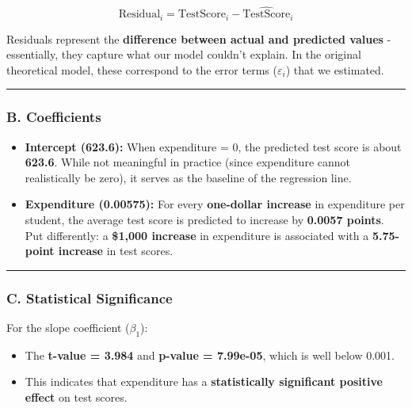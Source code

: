 \documentclass[
  12pt,
  letterpaper,
]{scrbook}
\providecommand{\tightlist}{%
  \setlength{\itemsep}{0pt}\setlength{\parskip}{0pt}}
\renewcommand{\tightlist}{\setlength{\itemsep}{0.5\baselineskip}\setlength{\parskip}{0.2\baselineskip}}
\theoremstyle{plain}
\theoremstyle{definition}
\theoremstyle{remark}
\begin{document}
\[
\text{Residual}_i = \text{TestScore}_i - \widehat{\text{TestScore}}_i
\]

Residuals represent the \textbf{difference between actual and predicted
values} - essentially, they capture what our model couldn't explain. In
the original theoretical model, these correspond to the error terms
(\(\varepsilon_i\)) that we estimated.

\begin{center}\rule{0.5\linewidth}{0.5pt}\end{center}

\subsubsection{\texorpdfstring{B.
\textbf{Coefficients}}{B. Coefficients}}\label{b.-coefficients}

\begin{itemize}
\item
  \textbf{Intercept (623.6):} When expenditure = 0, the predicted test
  score is about \textbf{623.6}. While not meaningful in practice (since
  expenditure cannot realistically be zero), it serves as the baseline
  of the regression line.
\item
  \textbf{Expenditure (0.00575):} For every \textbf{one-dollar increase}
  in expenditure per student, the average test score is predicted to
  increase by \textbf{0.0057 points}. Put differently: a \textbf{\$1,000
  increase} in expenditure is associated with a \textbf{5.75-point
  increase} in test scores.
\end{itemize}

\begin{center}\rule{0.5\linewidth}{0.5pt}\end{center}

\subsubsection{\texorpdfstring{C. \textbf{Statistical
Significance}}{C. Statistical Significance}}\label{c.-statistical-significance}

For the slope coefficient (\(\beta_1\)):

\begin{itemize}
\tightlist
\item
  The \textbf{t-value = 3.984} and \textbf{p-value = 7.99e-05}, which is
  well below 0.001.
\item
  This indicates that expenditure has a \textbf{statistically
  significant positive effect} on test scores.
\end{itemize}
\end{document}
